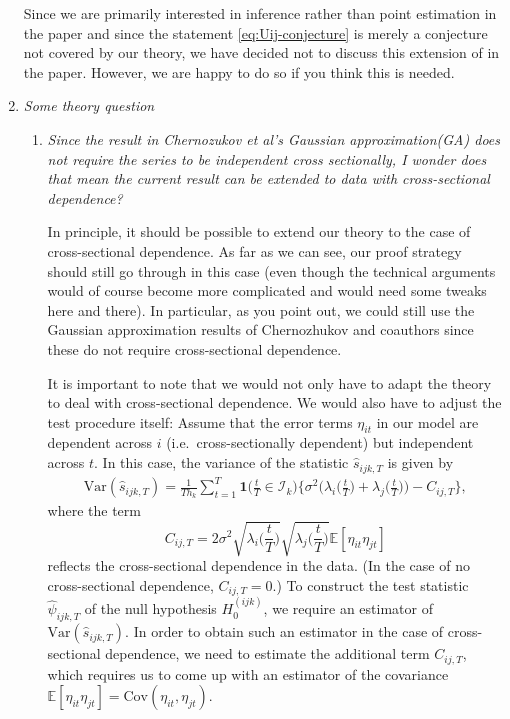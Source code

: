 \documentclass[a4paper,12pt]{article}
\begin{document}
\begin{enumerate}[label=(\arabic*),leftmargin=0.7cm]
Since we are primarily interested in inference rather than point estimation in the paper and since the statement \eqref{eq:Uij-conjecture} is merely a conjecture not covered by our theory, we have decided not to discuss this extension of in the paper. However, we are happy to do so if you think this is needed. 
 

\item \textit{Some theory question}

\begin{enumerate}[label=(\alph*),leftmargin=0.7cm]

\item \textit{Since the result in Chernozukov et al's Gaussian approximation(GA) does not require the series to be independent cross sectionally, I wonder does that mean the current result can be extended to data with cross-sectional dependence?}

In principle, it should be possible to extend our theory to the case of cross-sectional dependence. As far as we can see, our proof strategy should still go through in this case (even though the technical arguments would of course become more complicated and would need some tweaks here and there). In particular, as you point out, we could still use the Gaussian approximation results of Chernozhukov and coauthors since these do not require cross-sectional dependence. 

It is important to note that we would not only have to adapt the theory to deal with cross-sectional dependence. We would also have to adjust the test procedure itself: Assume that the error terms $\eta_{it}$ in our model are dependent across $i$ (i.e.\ cross-sectionally dependent) but independent across $t$. In this case, the variance of the statistic $\hat{s}_{ijk,T}$ is given by
\begin{align*}
\text{Var}(\hat{s}_{ijk,T}) = \frac{1}{Th_k} \sum_{t=1}^T \boldsymbol{1}\Big(\frac{t}{T} \in \mathcal{I}_k\Big) \bigg\{ \sigma^2 \Big( \lambda_i\Big(\frac{t}{T}\Big) + \lambda_j\Big(\frac{t}{T}\Big) \Big) - C_{ij,T} \bigg\},    
\end{align*}
where the term 
\[ C_{ij,T} = 2 \sigma^2 \sqrt{\lambda_i\Big(\frac{t}{T}\Big)} \sqrt{\lambda_j\Big(\frac{t}{T}\Big)} \mathbb{E}[\eta_{it} \eta_{jt}] \]
reflects the cross-sectional dependence in the data. (In the case of no cross-sectional dependence, $C_{ij,T} = 0$.) To construct the test statistic $\hat{\psi}_{ijk,T}$ of the null hypothesis $H_0^{(ijk)}$, we require an estimator of $\text{Var}(\hat{s}_{ijk,T})$. In order to obtain such an estimator in the case of cross-sectional dependence, we need to estimate the additional term $C_{ij,T}$, which requires us to come up with an estimator of the covariance $\mathbb{E}[\eta_{it} \eta_{jt}] = \text{Cov}(\eta_{it},\eta_{jt})$. 


\end{enumerate}
\end{enumerate}
\end{document}
